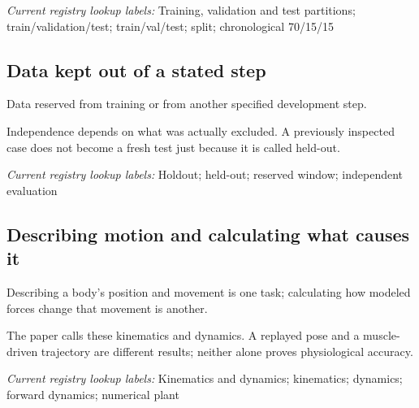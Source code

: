 \noindent\textit{Current registry lookup labels:} Training, validation and test partitions; train/validation/test; train/val/test; split; chronological 70/15/15\par

\begin{samepage}
\subsection*{Data kept out of a stated step}
\noindent Data reserved from training or from another specified development step.\par
\end{samepage}
\begin{samepage}
\noindent Independence depends on what was actually excluded. A previously inspected case does not become a fresh test just because it is called held-out.\par\nopagebreak[4]

\end{samepage}


\noindent\textit{Current registry lookup labels:} Holdout; held-out; reserved window; independent evaluation\par

\begin{samepage}
\subsection*{Describing motion and calculating what causes it}
\noindent Describing a body’s position and movement is one task; calculating how modeled forces change that movement is another.\par
\end{samepage}
\begin{samepage}
\noindent The paper calls these kinematics and dynamics. A replayed pose and a muscle-driven trajectory are different results; neither alone proves physiological accuracy.\par\nopagebreak[4]

\end{samepage}


\noindent\textit{Current registry lookup labels:} Kinematics and dynamics; kinematics; dynamics; forward dynamics; numerical plant\par

